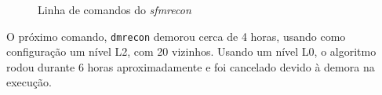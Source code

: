 \begin{figure}[!htpb]
	\centering
	\caption{Linha de comandos do \emph{sfmrecon}}
  	\label{fig:passosMVE}
\end{figure} 


O próximo comando, \texttt{dmrecon} demorou cerca de 4 horas, usando como
configuração um nível L2, com 20 vizinhos. %
Usando um
nível L0, o algoritmo rodou durante 6 horas aproximadamente e foi cancelado
devido à demora na execução. 


